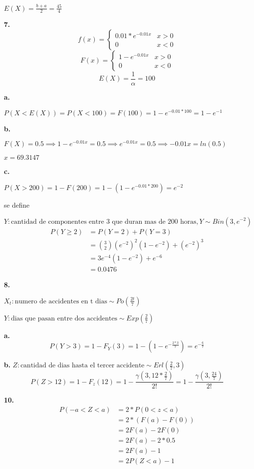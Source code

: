 \documentclass[12pt,fleqn]{article}
\begin{document}
$E(X)=\frac{b+a}{2}=\frac{45}{4}$

\textbf{7.}
\[f(x)=
  \begin{cases}
    0.01*e^{-0.01x}&x>0\\
    0&x<0
  \end{cases}\]
\[F(x)=
  \begin{cases}
    1-e^{-0.01x}&x>0\\
    0&x<0
  \end{cases}\]
\[E(X)=\frac{1}{\alpha}=100\]

\textbf{a.}

$P(X<E(X))=P(X<100)=F(100)=1-e^{-0.01*100}=1-e^{-1}$

\textbf{b.}

$F(X)=0.5 \implies 1-e^{-0.01x}=0.5 \implies e^{-0.01x}=0.5 \implies -0.01x=ln(0.5)$

$x=69.3147$

\textbf{c.}

$P(X>200)=1-F(200)=1-(1-e^{-0.01*200})=e^{-2}$

se define

$Y: \textrm{cantidad de componentes entre 3 que duran mas de 200 horas}, Y \sim Bin(3,e^{-2})$
\begin{align*}
  P(Y \ge 2)&=P(Y=2)+P(Y=3)\\
            &=\binom{3}{2}(e^{-2})^2(1-e^{-2})+(e^{-2})^3\\
            &=3e^{-4}(1-e^{-2})+e^{-6}\\
            &=0.0476
\end{align*}

\textbf{8.}

$X_t: \textrm{numero de accidentes en t dias} \sim Po(\frac{2t}{7})$

$Y: \textrm{dias que pasan entre dos accidentes} \sim Exp(\frac{2}{7})$

\textbf{a.}
\[P(Y>3)=1-F_Y(3)=1-(1-e^{-\frac{2*3}{7}})=e^{-\frac{6}{7}}\]

\textbf{b.}
$Z: \textrm{cantidad de dias hasta el tercer accidente} \sim Erl(\frac{2}{7},3)$
\[P(Z>12)=1-F_z(12)=1-\frac{\gamma(3,12*\frac{2}{7})}{2!}=1-\frac{\gamma(3,\frac{24}{7})}{2!}\]

\textbf{10.}
\begin{align*}
  P(-a<Z<a)&=2*P(0<z<a)\tag{Z simetrica alrededor de 0}\\
           &=2*(F(a)-F(0))\\
           &=2F(a)-2F(0)\\
           &=2F(a)-2*0.5\tag{$\mu=0$ es la mediana por Z normal}\\
           &=2F(a)-1\\
           &=2P(Z<a)-1
\end{align*}
\end{document}
